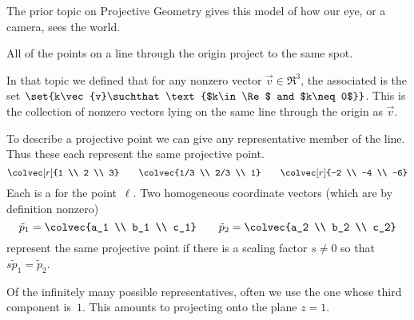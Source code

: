 The prior topic on Projective Geometry gives this model of 
how our eye, or a camera, sees the world.
\begin{center} 
\end{center}
All of the points on a line through the origin project to the same 
spot.

In that topic we defined that
for any nonzero vector $\vec{v}\in\Re^3$, the associated 
is the set $\set{k\vec{v}\suchthat \text{$k\in\Re$ and $k\neq 0$}}$.
This is the collection of nonzero vectors lying on the same line through the
origin as $\vec{v}$.

To describe a projective point we can give any representative member 
of the line. 
Thus these each represent the same projective point.
\begin{equation*}
  \colvec[r]{1 \\ 2 \\ 3}
  \qquad
  \colvec{1/3 \\ 2/3 \\ 1}
  \qquad
  \colvec[r]{-2 \\ -4 \\ -6}
\end{equation*} 
Each is a
%
for the point~$\ell$. 
Two homogeneous coordinate vectors (which are by definition nonzero)
\begin{equation*}
  \tilde{p}_1=\colvec{a_1 \\ b_1 \\ c_1}
  \qquad
  \tilde{p}_2=\colvec{a_2 \\ b_2 \\ c_2}
\end{equation*}
represent the same projective point if there is a scaling factor
$s\neq 0$ so that $s\tilde{p}_1=\tilde{p}_2$.

Of the infinitely many possible representatives,
often we use the one whose third component is~$1$.
This amounts to projecting onto the plane $z=1$.
\begin{center} 
\end{center}

